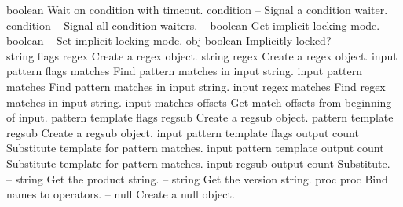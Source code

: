 \begin{longtable}{}
	{boolean}
	{Wait on condition with timeout.}
\hline
\optableent
	{condition}
	{{\bf {}}}
	{--}
	{Signal a condition waiter.}
\hline
\optableent
	{condition}
	{{\bf {}}}
	{--}
	{Signal all condition waiters.}
\hline
\optableent
	{--}
	{{\bf {}}}
	{boolean}
	{Get implicit locking mode.}
\hline
\optableent
	{boolean}
	{{\bf {}}}
	{--}
	{Set implicit locking mode.}
\hline
\optableent
	{obj}
	{{\bf {}}}
	{boolean}
	{Implicitly locked?}
\hline \hline
{} \\
\hline \hline
\optableent
	{string flags}
	{{\bf {}}}
	{regex}
	{Create a regex object.}
\optableent
	{string}
	{{\bf {}}}
	{regex}
	{Create a regex object.}
\hline
\optableent
	{input pattern flags}
	{{\bf {}}}
	{matches}
	{Find pattern matches in input string.}
\optableent
	{input pattern}
	{{\bf {}}}
	{matches}
	{Find pattern matches in input string.}
\optableent
	{input regex}
	{{\bf {}}}
	{matches}
	{Find regex matches in input string.}
\hline
\optableent
	{input matches}
	{{\bf {}}}
	{offsets}
	{Get match offsets from beginning of input.}
\hline
\optableent
	{pattern template flags}
	{{\bf {}}}
	{regsub}
	{Create a regsub object.}
\optableent
	{pattern template}
	{{\bf {}}}
	{regsub}
	{Create a regsub object.}
\hline
\optableent
	{input pattern template flags}
	{{\bf {}}}
	{output count}
	{Substitute template for pattern matches.}
\optableent
	{input pattern template}
	{{\bf {}}}
	{output count}
	{Substitute template for pattern matches.}
\optableent
	{input regsub}
	{{\bf {}}}
	{output count}
	{Substitute.}
\hline \hline
{} \\
\hline \hline
\optableent
	{--}
	{{\bf {}}}
	{string}
	{Get the product string.}
\hline
\optableent
	{--}
	{{\bf {}}}
	{string}
	{Get the version string.}
\hline
\optableent
	{proc}
	{{\bf {}}}
	{proc}
	{Bind names to operators.}
\hline
\optableent
	{--}
	{{\bf {}}}
	{null}
	{Create a null object.}
\end{longtable}

